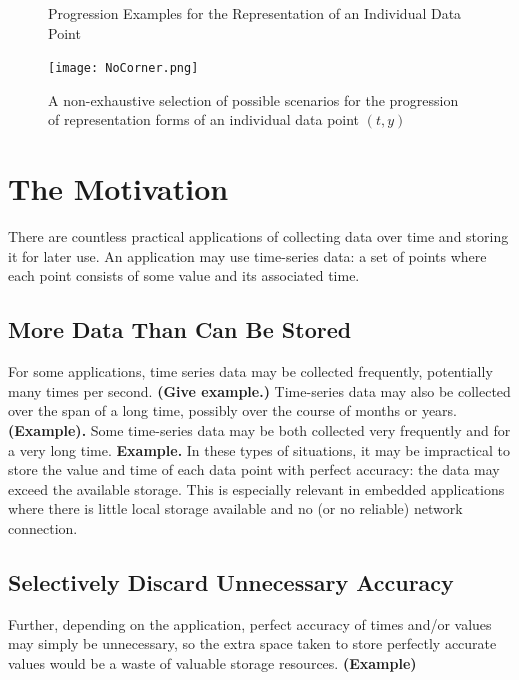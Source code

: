 \documentclass{article}
\begin{document}
\begin{figure}
    \centering
    \caption*{Progression Examples for the Representation of an Individual Data Point}
    \texttt{[image: NoCorner.png]}
    \caption{A non-exhaustive selection of possible scenarios for the progression of representation forms of an individual data point \((t,y)\)}
    \label{fig:does_not_create_a_corner}
\end{figure}


\newpage
\newpage
\mbox{} %



%
%
%
%


\section{The Motivation}
\label{sec:the_motivation}
There are countless practical applications of collecting data over time and storing it for later use. An application may use time-series data: a set of points where each point consists of some value and its associated time.

\subsection{More Data Than Can Be Stored}
\label{subsec:practical_applications}
For some applications, time series data may be collected frequently, potentially many times per second. \textbf{(Give example.) } Time-series data may also be collected over the span of a long time, possibly over the course of months or years. \textbf{(Example). } Some time-series data may be both collected very frequently and for a very long time. \textbf{Example.} In these types of situations, it may be impractical to store the value and time of each data point with perfect accuracy: the data may exceed the available storage. This is especially relevant in embedded applications where there is little local storage available and no (or no reliable) network connection.

\subsection{Selectively Discard Unnecessary Accuracy}
\label{subsec:unnecessary_accuracy}
Further, depending on the application, perfect accuracy of times and/or values may simply be unnecessary, so the extra space taken to store perfectly accurate values would be a waste of valuable storage resources. \textbf{(Example)}
\end{document}
